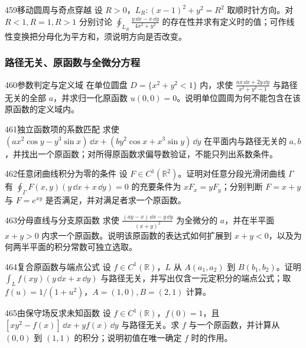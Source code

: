 \begin{exercise}{459}{移动圆周与奇点穿越}
设 $R>0$，$L_R:(x-1)^2+y^2=R^2$ 取顺时针方向。对 $R<1,R=1,R>1$ 分别讨论
$\oint_{L_R}\frac{y\,\dd x-x\,\dd y}{4x^2+y^2}$ 的存在性并求有定义时的值；可作线性变换把分母化为平方和，须说明方向是否改变。
\end{exercise}

\subsubsection{路径无关、原函数与全微分方程}

\begin{exercise}{460}{参数判定与定义域}
在单位圆盘 $D=\{x^2+y^2<1\}$ 内，求使 $\frac{ax\,\dd x+2y\,\dd y}{x^2+y^2-1}$ 与路径无关的全部 $a$，并求归一化原函数 $u(0,0)=0$。说明单位圆周为何不能包含在该原函数的定义域内。
\end{exercise}

\begin{exercise}{461}{独立函数项的系数匹配}
求使 $(ax^2\cos y-y^3\sin x)\,\dd x+(by^2\cos x+x^3\sin y)\,\dd y$ 在平面内与路径无关的 $a,b$，并找出一个原函数；对所得原函数求偏导数验证，不能只列出系数条件。
\end{exercise}

\begin{exercise}{462}{任意闭曲线积分为零的条件}
设 $F\in C^1(\mathbb R^2)$。证明对任意分段光滑闭曲线 $\Gamma$ 有 $\oint_\Gamma F(x,y)(y\,\dd x+x\,\dd y)=0$ 的充要条件为 $xF_x=yF_y$；分别判断 $F=x+y$ 与 $F=e^{xy}$ 是否满足，并对满足者求一个原函数。
\end{exercise}

\begin{exercise}{463}{分母直线与分支原函数}
求使 $\frac{(ay-x)\,\dd x-y\,\dd y}{(x+y)^2}$ 为全微分的 $a$，并在半平面 $x+y>0$ 内求一个原函数。说明该原函数的表达式如何扩展到 $x+y<0$，以及为何两半平面的积分常数可独立选取。
\end{exercise}

\begin{exercise}{464}{复合原函数与端点公式}
设 $f\in C^1(\mathbb R)$，$L$ 从 $A(a_1,a_2)$ 到 $B(b_1,b_2)$。证明 $\int_Lf(xy)(y\,\dd x+x\,\dd y)$ 与路径无关，并写出仅含一元定积分的端点公式；取 $f(u)=1/(1+u^2)$，$A=(1,0),B=(2,1)$ 计算。
\end{exercise}

\begin{exercise}{465}{由保守场反求未知函数}
设 $f\in C^1(\mathbb R)$，$f(0)=1$，且 $[xy^2-f(x)]\,\dd x+yf(x)\,\dd y$ 与路径无关。求 $f$ 与一个原函数，并计算从 $(0,0)$ 到 $(1,1)$ 的积分；说明初值在唯一确定 $f$ 时的作用。
\end{exercise}

